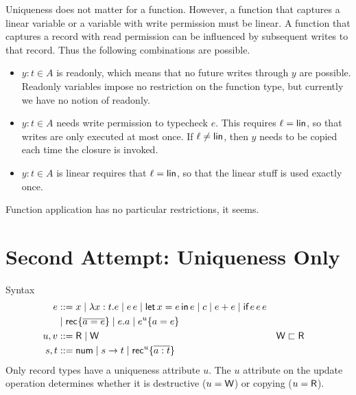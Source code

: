 \documentclass{llncs}
\begin{document}
\begin{mathpar}
\end{mathpar}
Uniqueness does not matter for a function. However, a function that captures a linear variable or a variable with write permission must be linear. A function that captures a record with read permission can be influenced by subsequent writes to that record. Thus the following combinations are possible.
\begin{itemize}
\item $y:t \in A$ is readonly, which means that no future writes through $y$ are possible. Readonly variables impose no restriction on the function type, but currently we have no notion of readonly.
\item $y:t \in A$ needs write permission to typecheck $e$. This requires $\ell = \LIN$, so that writes are only executed at  most once. If $\ell \ne\LIN$, then $y$ needs to be copied each time the closure is invoked.
\item $y:t \in A$ is linear requires that $\ell = \LIN$, so that the linear stuff is used exactly once.
\end{itemize}
\begin{mathpar}
\end{mathpar}
Function application has no particular restrictions, it seems.
\begin{mathpar}
\end{mathpar}

\clearpage{}

\section{Second Attempt: Uniqueness Only}
\label{sec:second-attempt:-uniq}

Syntax
\begin{align*}
  e &::= x \mid \LAM xte \mid \APP ee \mid \LET xee  \mid c \mid e+e \mid \IF eee\\
  &\mid \REC{ \overline{a=e}} \mid \GET ea \mid \UPD[u] eae \\
  u,v &::= \READ \mid \WRITE & \WRITE & \sqsubset \READ \\
  s,t &::= \NUM \mid s \to t \mid \REC[u]{ \overline{a : t}}
\end{align*}
Only record types have a uniqueness attribute $u$.
The $u$ attribute on the update operation determines whether it is destructive ($u=\WRITE$) or copying ($u=\READ$).
\end{document}
